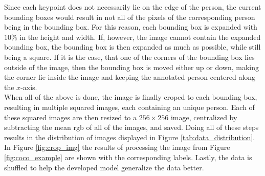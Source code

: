 \documentclass[main.tex]{subfiles}
\begin{document}
Since each keypoint does not necessarily lie on the edge of the person, the current bounding boxes would result in not all of the pixels of the corresponding person being in the bounding box. For this reason, each bounding box is expanded with $10\%$ in the height and width. If, however, the image cannot contain the expanded bounding box, the bounding box is then expanded as much as possible, while still being a square. If it is the case, that one of the corners of the bounding box lies outside of the image, then the bounding box is moved either up or down, making the corner lie inside the image and keeping the annotated person centered along the $x$-axis. \\
When all of the above is done, the image is finally croped to each bounding box, resulting in multiple squared images, each containing an unique person. Each of these squared images are then resized to a $256 \times 256$ image, centralized by subtracting the mean rgb of all of the images, and saved. Doing all of these steps results in the distribution of images displayed in Figure \ref{tab:data_distribution}. In Figure \ref{fig:crop_img} the results of processing the image from Figure \ref{fig:coco_example} are shown with the corresponding labels. Lastly, the data is shuffled to help the developed model generalize the data better.
\end{document}
